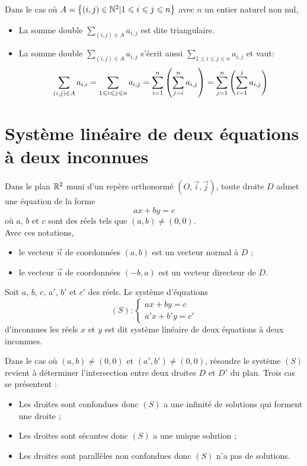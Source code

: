 \begin{defprop}
	Dans le cas où \(A = \left\lbrace(i,j) \in \mathbb{N}^2 | 1 \leqslant i \leqslant j \leqslant n\right\rbrace\) avec \(n\) un entier naturel non nul,
	\begin{itemize}
		\item La somme double \(\sum_{(i,j)\in A} a_{i,j}\) est dite triangulaire.
		\item La somme double \(\sum_{(i,j)\in A} a_{i,j}\) s'écrit aussi \(\sum_{1\leq i \leq j \leq n} a_{i,j}\) et vaut:
		      \[\sum_{(i,j)\in A} a_{i,i} = \sum_{1\leqslant i \leqslant j \leqslant n} a_{i,j} = \sum_{i=1}^n \left(\sum_{j=i}^n a_{i,j}\right) = \sum_{j=1}^n \left(\sum_{i=1}^j a_{i,j}\right)\]
	\end{itemize}
\end{defprop}


\section{Système linéaire de deux équations à deux inconnues}
\begin{defprop}
	Dans le plan \(\mathbb{R}^2\) muni d’un repère orthonormé \((O,\vec{i},\vec{j})\), toute droite \(D\) admet une équation de la forme \[ax + by = c\]
	où \(a\), \(b\) et \(c\) sont des réels tels que \((a,b)\neq (0,0)\). \\
	Avec ces notations,
	\begin{itemize}
		\item le vecteur \(\vec{n}\) de coordonnées \((a,b)\) est un vecteur normal à \(D\) ;
		\item le vecteur \(\vec{u}\) de coordonnées \((-b,a)\) est un vecteur directeur de \(D\).
	\end{itemize}
\end{defprop}

\begin{defprop}
	Soit \(a\), \(b\), \(c\), \(a'\), \(b'\) et \(c'\) des réels. Le système d’équations
	\[
		(S) :
		\begin{cases}
			ax + by = c \\
			a'x + b'y = c'
		\end{cases}
	\]
	d’inconnues les réels \(x\) et \(y\) est dit système linéaire de deux équations à deux inconnues.
\end{defprop}

\begin{defprop}
	Dans le cas où \((a,b)\neq (0,0)\) et \((a',b')\neq (0,0)\), résoudre le système \((S)\) revient à  déterminer l’intersection entre deux droites \(D\) et \(D'\) du plan.
	Trois cas se présentent :
	\begin{itemize}
		\item Les droites sont confondues donc \((S)\) a une infinité de solutions qui forment une droite ;
		\item Les droites sont sécantes donc \((S)\) a une unique solution ;
		\item Les droites sont parallèles non confondues donc \((S)\) n’a pas de solutions.
	\end{itemize}
\end{defprop}


